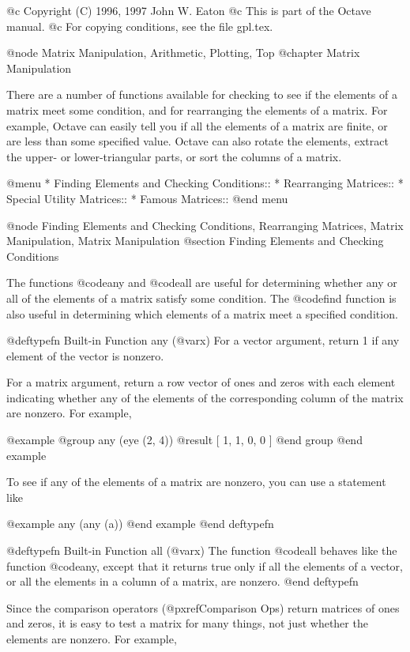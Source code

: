 @c Copyright (C) 1996, 1997 John W. Eaton
@c This is part of the Octave manual.
@c For copying conditions, see the file gpl.tex.

@node Matrix Manipulation, Arithmetic, Plotting, Top
@chapter Matrix Manipulation

There are a number of functions available for checking to see if the
elements of a matrix meet some condition, and for rearranging the
elements of a matrix.  For example, Octave can easily tell you if all
the elements of a matrix are finite, or are less than some specified
value.  Octave can also rotate the elements, extract the upper- or
lower-triangular parts, or sort the columns of a matrix.

@menu
* Finding Elements and Checking Conditions::  
* Rearranging Matrices::        
* Special Utility Matrices::    
* Famous Matrices::             
@end menu

@node Finding Elements and Checking Conditions, Rearranging Matrices, Matrix Manipulation, Matrix Manipulation
@section Finding Elements and Checking Conditions

The functions @code{any} and @code{all} are useful for determining
whether any or all of the elements of a matrix satisfy some condition.
The @code{find} function is also useful in determining which elements of
a matrix meet a specified condition.

@deftypefn {Built-in Function} {} any (@var{x})
For a vector argument, return 1 if any element of the vector is
nonzero.

For a matrix argument, return a row vector of ones and
zeros with each element indicating whether any of the elements of the
corresponding column of the matrix are nonzero.  For example,

@example
@group
any (eye (2, 4))
     @result{} [ 1, 1, 0, 0 ]
@end group
@end example

To see if any of the elements of a matrix are nonzero, you can use a
statement like

@example
any (any (a))
@end example
@end deftypefn

@deftypefn {Built-in Function} {} all (@var{x})
The function @code{all} behaves like the function @code{any}, except
that it returns true only if all the elements of a vector, or all the
elements in a column of a matrix, are nonzero.
@end deftypefn

Since the comparison operators (@pxref{Comparison Ops}) return matrices
of ones and zeros, it is easy to test a matrix for many things, not just
whether the elements are nonzero.  For example, 

